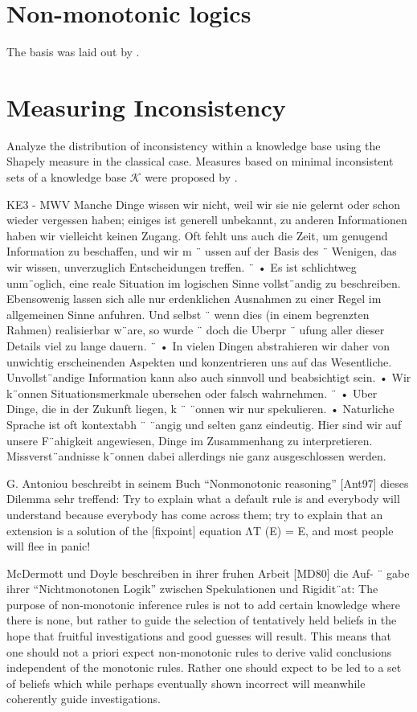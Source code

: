 \section{Non-monotonic logics}
The basis was laid out by \cite{mcdermott_non-monotonic_1980}.

\section{Measuring Inconsistency}
Analyze the distribution of inconsistency within a knowledge base using the Shapely measure \cite{hunter_measure_2010} in the classical case. Measures based on minimal inconsistent sets of a knowledge base \(\mathcal{K}\) \cite{jabbour_mis_2016} were proposed by \cite{ulbricht_measuring_2018}.

KE3 - MWV
Manche Dinge wissen wir nicht, weil wir sie nie gelernt oder schon wieder
vergessen haben; einiges ist generell unbekannt, zu anderen Informationen haben wir vielleicht keinen Zugang. Oft fehlt uns auch die Zeit, um
genugend Information zu beschaffen, und wir m ¨ ussen auf der Basis des ¨
Wenigen, das wir wissen, unverzuglich Entscheidungen treffen. ¨
• Es ist schlichtweg unm¨oglich, eine reale Situation im logischen Sinne
vollst¨andig zu beschreiben. Ebensowenig lassen sich alle nur erdenklichen
Ausnahmen zu einer Regel im allgemeinen Sinne anfuhren. Und selbst ¨
wenn dies (in einem begrenzten Rahmen) realisierbar w¨are, so wurde ¨
doch die Uberpr ¨ ufung aller dieser Details viel zu lange dauern. ¨
• In vielen Dingen abstrahieren wir daher von unwichtig erscheinenden
Aspekten und konzentrieren uns auf das Wesentliche. Unvollst¨andige Information kann also auch sinnvoll und beabsichtigt sein.
• Wir k¨onnen Situationsmerkmale ubersehen oder falsch wahrnehmen. ¨
• Uber Dinge, die in der Zukunft liegen, k ¨ ¨onnen wir nur spekulieren.
• Naturliche Sprache ist oft kontextabh ¨ ¨angig und selten ganz eindeutig.
Hier sind wir auf unsere F¨ahigkeit angewiesen, Dinge im Zusammenhang
zu interpretieren. Missverst¨andnisse k¨onnen dabei allerdings nie ganz
ausgeschlossen werden.

G. Antoniou beschreibt in seinem Buch “Nonmonotonic reasoning” [Ant97]
dieses Dilemma sehr treffend:
Try to explain what a default rule is and everybody will understand
because everybody has come across them; try to explain that an
extension is a solution of the [fixpoint] equation ΛT (E) = E, and
most people will flee in panic!

McDermott und Doyle beschreiben in ihrer fruhen Arbeit [MD80] die Auf- ¨
gabe ihrer “Nichtmonotonen Logik” zwischen Spekulationen und Rigidit¨at:
The purpose of non-monotonic inference rules is not to add certain
knowledge where there is none, but rather to guide the selection of
tentatively held beliefs in the hope that fruitful investigations and
good guesses will result. This means that one should not a priori
expect non-monotonic rules to derive valid conclusions independent
of the monotonic rules. Rather one should expect to be led to a
set of beliefs which while perhaps eventually shown incorrect will
meanwhile coherently guide investigations.